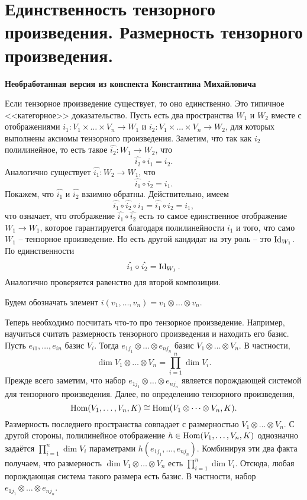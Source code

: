 \section{
 Единственность тензорного произведения. Размерность тензорного произведения.
}

\textbf{Необработанная версия из конспекта Константина Михайловича}

\lm Если тензорное произведение существует, то оно единственно.
\proof Это типичное <<категорное>> доказательство. Пусть есть два пространства $W_1$ и $W_2$ вместе с отображениями $i_1 \colon V_1\times \dots\times V_n \to W_1$ и $i_2 \colon V_1\times \dots\times V_n \to W_2$, для которых выполнены аксиомы тензорного произведения. Заметим, что так как $i_2$ полилинейное, то есть такое $\hat{i_2} \colon W_1 \to W_2$, что $$\hat{i_2}\circ i_1= i_2.$$ 
Аналогично существует $\hat{i_1} \colon W_2 \to W_1$, что
$$\hat{i_1}\circ i_2= i_1.$$ 
Покажем, что $\hat{i_1} $ и $\hat{i_2}$ взаимно обратны. Действительно, имеем
$$\hat{i_1}\circ \hat{i_2}\circ i_1= \hat{i_1}\circ i_2= i_1,$$
что означает, что отображение $\hat{i_1}\circ \hat{i_2}$ есть то самое единственное отображение $W_1\to W_1$, которое гарантируется благодаря полилинейности $i_1$ и того, что само $W_1$ -- тензорное произведение. Но есть другой кандидат на эту роль -- это $\operatorname{Id}_{W_1}$. По единственности 
$$\hat{i_1}\circ \hat{i_2}=\operatorname{Id}_{W_1}.$$
Аналогично проверяется равенство для второй композиции.
\endproof
\elm

\dfn Будем обозначать элемент $i(v_1,\dots,v_n)=v_1\otimes \dots \otimes v_n$. 
\edfn

Теперь необходимо посчитать что-то про тензорное произведение. Например, научиться считать размерность тензорного произведения и находить его базис.
\thrm Пусть $e_{i1},\dots,e_{in}$ базис $V_i$. Тогда $e_{1j_1}\otimes \dots \otimes e_{nj_n}$ базис $V_1 \otimes \dots \otimes V_n$. В частности, 
$$\dim V_1 \otimes \dots \otimes V_n= \prod_{i=1}^n \dim V_i.$$ 
\proof Прежде всего заметим, что набор $e_{1j_1}\otimes \dots \otimes e_{nj_n}$ является порождающей системой для тензорного произведения. Далее, по определению тензорного произведения,
$$\operatorname{Hom}(V_1,\dots,V_n, K) \cong \operatorname{Hom}(V_1\otimes \dots \otimes V_n,K).$$
Размерность последнего пространства совпадает с размерностью $V_1\otimes \dots \otimes V_n$. С другой стороны, полилинейное отображение $h \in \operatorname{Hom}(V_1,\dots,V_n, K)$ однозначно задаётся $\prod_{i=1}^n \dim V_i$  параметрами $h(e_{1j_1}, \dots,e_{nj_n})$. Комбинируя эти два факта получаем, что размерность $\dim V_1 \otimes \dots \otimes V_n$ есть $\prod_{i=1}^n \dim V_i$. Отсюда, любая порождающая система такого размера есть базис. В частности, набор $e_{1j_1}\otimes \dots \otimes e_{nj_n}$.
\endproof
\ethrm

